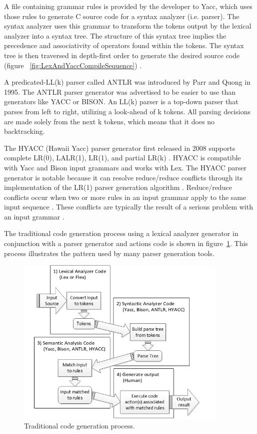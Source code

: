 \indent
A file containing grammar rules is provided by the developer to Yacc, which uses those rules to generate C source code for a syntax analyzer (i.e. parser).  The syntax analyzer uses this grammar to transform the tokens output by the lexical analyzer into a syntax tree.  The structure of this syntax tree implies the precedence and associativity of operators found within the tokens.  The syntax tree is then traversed in depth-first order to generate the desired source code (figure ~\ref{fig:LexAndYaccCompileSequence}) \cite{niemann_01}.

\indent
A predicated-LL(k) parser called ANTLR \cite{parr_01} was introduced by Parr and Quong in 1995.  The ANTLR parser generator was advertised to be easier to use than generators like YACC or BISON.  An LL(k) parser is a top-down parser that parses from left to right, utilizing a look-ahead of k tokens.  All parsing decisions are made solely from the next k tokens, which means that it does no backtracking.

\indent
The HYACC (Hawaii Yacc) parser generator first released in 2008 supports complete LR(0), LALR(1), LR(1), and partial LR(k) \cite{chen_01,chen_02}.  HYACC is compatible with Yacc and Bison input grammars and works with Lex.  The HYACC parser generator is notable because it can resolve reduce/reduce conflicts through its implementation of the LR(1) parser generation algorithm \cite{chen_01}.  Reduce/reduce conflicts occur when two or more rules in an input grammar apply to the same input sequence \cite{free_01}.  These conflicts are typically the result of a serious problem with an input grammar \cite{free_01}.

\indent
The traditional code generation process using a lexical analyzer generator in conjunction with a parser generator and actions code is shown in figure~\ref{fig:TraditionalCodeGenProcess}.  This process illustrates the pattern used by many parser generation tools.

\begin{figure}[h!]
\centering
\includegraphics[width=0.9\textwidth]{figures/TraditionalCodeGenProcess.png}
\caption{Traditional code generation process.}
\label{fig:TraditionalCodeGenProcess}
\end{figure}

